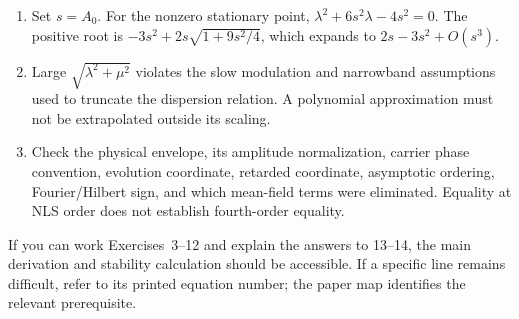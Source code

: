 \begin{enumerate}[label=\textbf{\arabic*.}]
\item Set $s=A_0$. For the nonzero stationary point,
$\lambda^2+6s^2\lambda-4s^2=0$.
The positive root is $-3s^2+2s\sqrt{1+9s^2/4}$,
which expands to $2s-3s^2+O(s^3)$.
\item Large $\sqrt{\lambda^2+\mu^2}$ violates the slow modulation
and narrowband assumptions used to truncate the dispersion relation.
A polynomial approximation must not be extrapolated outside its scaling.
\item Check the physical envelope, its amplitude normalization, carrier
phase convention, evolution coordinate, retarded coordinate, asymptotic
ordering, Fourier/Hilbert sign, and which mean-field terms were eliminated.
Equality at NLS order does not establish fourth-order equality.
\end{enumerate}

If you can work Exercises~3--12 and explain the answers to 13--14, the
main derivation and stability calculation should be accessible. If a
specific line remains difficult, refer to its printed equation number;
the paper map identifies the relevant prerequisite.
\clearpage
